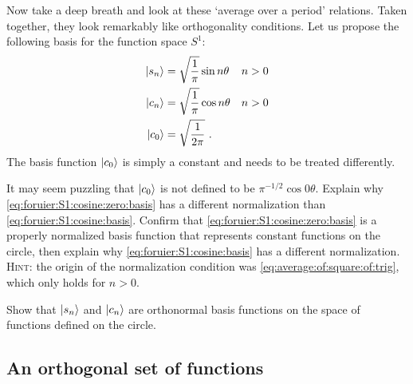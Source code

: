 \documentclass[12pt, oneside]{report}    %
\begin{document}
Now take a deep breath and look at these `average over a period' relations. 
Taken together, they look remarkably like orthogonality conditions. Let us propose the following basis for the function space $S^1$:
\begin{align}
    \left|s_n\right\rangle &= \sqrt{\frac{1}{\pi}} \sin n\theta
    &
    n&>0
    \label{eq:foruier:S1:sine:basis}
    \\
    \left|c_n\right\rangle &= \sqrt{\frac{1}{\pi}} \cos n\theta 
    &
    n&> 0
    \label{eq:foruier:S1:cosine:basis}
    \\
    \left|c_0\right\rangle &= \sqrt{\frac{1}{2\pi}} 
    \label{eq:foruier:S1:cosine:zero:basis}
    \ .
\end{align}
The basis function $\left|c_0\right\rangle$ is simply a constant and needs to be treated differently.
\begin{exercise}
It may seem puzzling that $\left|c_0\right\rangle$ is not defined to be $\pi^{-1/2}\cos 0\theta$. Explain why \eqref{eq:foruier:S1:cosine:zero:basis} has a different normalization than \eqref{eq:foruier:S1:cosine:basis}. Confirm that \eqref{eq:foruier:S1:cosine:zero:basis} is a properly normalized basis function that represents constant functions on the circle, then explain why \eqref{eq:foruier:S1:cosine:basis} has a different normalization.  \textsc{Hint}: the origin of the normalization condition was \eqref{eq:average:of:square:of:trig}, which only holds for $n>0$.
\end{exercise}
\begin{exercise}
Show that $\left|s_n\right\rangle$ and $\left|c_n\right\rangle$ are orthonormal basis functions on the space of functions defined on the circle.
\end{exercise}



\subsection{An orthogonal set of functions}
\end{document}
